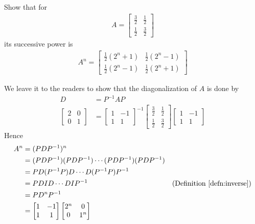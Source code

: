 \begin{exmp}
\label{exmp:powerdiag}
Show that for
\begin{align*}
A = 
\begin{bmatrix}
\frac{3}{2} & \frac{1}{2} \\
\frac{1}{2} & \frac{3}{2}
\end{bmatrix}
\end{align*}
its successive power is
\begin{align*}
A^n =
\begin{bmatrix}
\frac{1}{2}(2^n + 1) & \frac{1}{2}(2^n - 1) \\
\frac{1}{2}(2^n - 1) & \frac{1}{2}(2^n + 1)
\end{bmatrix}
\end{align*}
\begin{solution}
We leave it to the readers to show that the diagonalization of $A$ is done by
\begin{align*}
D &= P^{-1}AP \\
\begin{bmatrix}
2 & 0 \\
0 & 1
\end{bmatrix} &=
\begin{bmatrix}
1 & -1 \\
1 & 1
\end{bmatrix}^{-1}
\begin{bmatrix}
\frac{3}{2} & \frac{1}{2} \\
\frac{1}{2} & \frac{3}{2}
\end{bmatrix} 
\begin{bmatrix}
1 & -1 \\
1 & 1
\end{bmatrix}
\end{align*}
Hence
\begin{align*}
A^n &= (PDP^{-1})^n \\
&= (PDP^{-1})(PDP^{-1})\cdots(PDP^{-1})(PDP^{-1}) \\
&= PD(P^{-1}P)D\cdots D(P^{-1}P)P^{-1} \\
&= PDID \cdots DIP^{-1} & \text{(Definition \ref{defn:inverse})} \\
&= PD^nP^{-1} \\
&= \begin{bmatrix}
1 & -1 \\
1 & 1
\end{bmatrix}
\begin{bmatrix}
2^n & 0 \\
0 & 1^n
\end{bmatrix}

\end{align*}
\end{solution}
\end{exmp}
